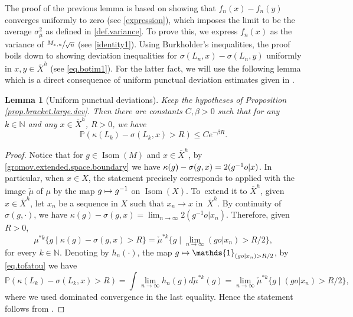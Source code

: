 \documentclass[JEP,XML,SOM,Unicode,published]{cedram}
\newcommand\mto{\mathchoice{\longmapsto}{\mapsto}{\mapsto}{\mapsto}}
\let\sep\mid
\let\ts\textstyle
\theoremstyle{plain}
\newtheorem{lemma}[theorem]{Lemma}
\theoremstyle{definition}
\newcommand\N{\mathbb{N}}
\DeclareMathOperator\Isom{Isom}
\begin{document}
The proof of the previous lemma is based on showing that $f_n(x)-f_n(y)$ converges uniformly to zero (see \eqref{expression}), which imposes the limit to be the average $\sigma_{\mu}^2$ as defined in \eqref{def.variance}. To prove this, we express $f_n(x)$ as the variance of $\sfrac{M_{x,n}}{\sqrt{n}}$ (see \eqref{identity1}). Using Burkholder's inequalities, the proof boils down to showing deviation inequalities for $\sigma(L_n,x)-\sigma(L_n,y)$ uniformly in $x,y\in \overline{X}^h$ (see \eqref{eq.botim1}). For the latter fact, we will use the following lemma which is a direct consequence of uniform punctual deviation estimates given in \cite[Prop.\,2.12]{BMSS}.

\begin{lemma}[Uniform punctual deviations]\label{lemma.unif.punctual}
Keep the hypotheses of Proposition \ref{prop.bracket.large.dev}. Then there are constants $C, \beta >0$ such that for any $k \in \N$ and any $x \in \overline{X}^h$, $R>0$, we have
\[
\mathbb{P}(\kappa(L_k)-\sigma(L_k,x) > R) \leq C e^{-\beta R}.
\]
\end{lemma}
\begin{proof}
Notice that for $g\in \Isom(M)$ and $x \in \overline{X}^h$, by \eqref{gromov.extended.space.boundary} we have $\kappa(g)-\nobreak\sigma(g,x)=2(g^{-1}o | x)$. In particular, when $x \in X$, the statement precisely corresponds to \hbox{\cite[Prop.\,2.12]{BMSS}} applied with the image $\check{\mu}$ of $\mu$ by the map $g \mto g^{-1}$ on $\Isom(X)$. To~extend it to $\overline{X}^h$, given $x \in \overline{X}^h$, let $x_n$ be a sequence in $X$ such that $x_n \to x$ in~$\overline{X}^h$. By continuity of $\sigma(g,\cdot)$, we have $\kappa(g)-\sigma(g,x)=\lim_{n \to \infty}2(g^{-1}o|x_n)$. Therefore, given $R>0$,
\begin{equation}\label{eq.tofatou}\ts
\mu^{\ast k}\{g \sep \kappa(g)-\sigma(g,x) >R \}=\check{\mu}^{\ast k} \{g \sep \lim_{n \to \infty}(go|x_n) >R/2\},
\end{equation}
for every $k \in \N$. Denoting by $h_n(\cdot)$, the map $g \mto \mathds{1}_{(go|x_n)>R/2}$, by \eqref{eq.tofatou} we have
\[
\mathbb{P}(\kappa(L_k)-\sigma(L_k,x) > R)=\int \lim_{n \to \infty}h_n(g) d\check{\mu}^{\ast k}(g)=\lim_{n \to \infty} \check{\mu}^{\ast k} \{g\sep (go|x_n) >R/2\},
\]
where we used dominated convergence in the last equality.
Hence the statement follows from \cite[Prop.\,2.12]{BMSS}.
\end{proof}
\end{document}
